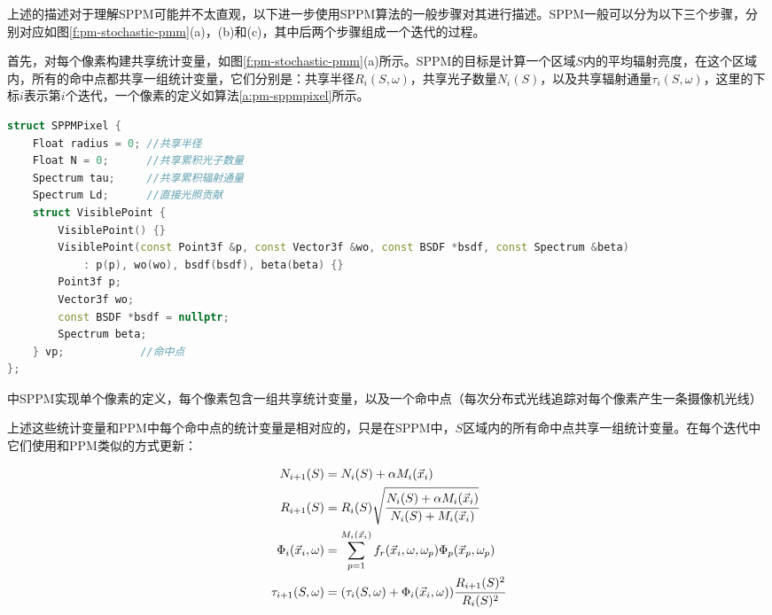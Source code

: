 上述的描述对于理解SPPM可能并不太直观，以下进一步使用SPPM算法的一般步骤对其进行描述。SPPM一般可以分为以下三个步骤，分别对应如图\ref{f:pm-stochastic-pmm}(a)，(b)和(c)，其中后两个步骤组成一个迭代的过程。

首先，对每个像素构建共享统计变量，如图\ref{f:pm-stochastic-pmm}(a)所示。SPPM的目标是计算一个区域$S$内的平均辐射亮度，在这个区域内，所有的命中点都共享一组统计变量，它们分别是：共享半径$R_i(S,{\omega})$，共享光子数量$N_i(S)$，以及共享辐射通量$\tau_i(S,{\omega})$，这里的下标$i$表示第$i$个迭代，一个像素的定义如算法\ref{a:pm-sppmpixel}所示。

\begin{algorithm}
\begin{lstlisting}[language=C++, mathescape]
struct SPPMPixel {
    Float radius = 0; //共享半径
    Float N = 0;      //共享累积光子数量
    Spectrum tau;     //共享累积辐射通量
    Spectrum Ld;      //直接光照贡献
    struct VisiblePoint {
        VisiblePoint() {}
        VisiblePoint(const Point3f &p, const Vector3f &wo, const BSDF *bsdf, const Spectrum &beta)
            : p(p), wo(wo), bsdf(bsdf), beta(beta) {}
        Point3f p;
        Vector3f wo;
        const BSDF *bsdf = nullptr;
        Spectrum beta;
    } vp;            //命中点
};
\end{lstlisting}	
\caption{\cite{b:pbrt}中SPPM实现单个像素的定义，每个像素包含一组共享统计变量，以及一个命中点（每次分布式光线追踪对每个像素产生一条摄像机光线）}
\label{a:pm-sppmpixel}
\end{algorithm}

上述这些统计变量和PPM中每个命中点的统计变量是相对应的，只是在SPPM中，$S$区域内的所有命中点共享一组统计变量。在每个迭代中它们使用和PPM类似的方式更新：

\begin{equation}\label{e:pm-shared-statistics}
\begin{aligned}
	N_{i+1}(S) &=N_i(S)+\alpha M_i(\vec{x}_i)\\
	R_{i+1}(S) &=R_i(S)\sqrt{ \cfrac{N_i(S)+\alpha M_i(\vec{x}_i)}{N_i(S)+M_i(\vec{x}_i)}}\\
	\Phi_i(\vec{x}_i,{\omega})&=\sum^{M_i(\vec{x}_i)}_{p=1}f_r(\vec{x}_i,{\omega},{\omega}_p)\Phi_p(\vec{x}_p,{\omega}_p)\\
	\tau_{i+1}(S,{\omega})&=(\tau_{i}(S,{\omega})+\Phi_i(\vec{x}_i,{\omega})) \cfrac{R_{i+1}(S)^{2}}{R_i (S)^{2}}
\end{aligned}
\end{equation}

